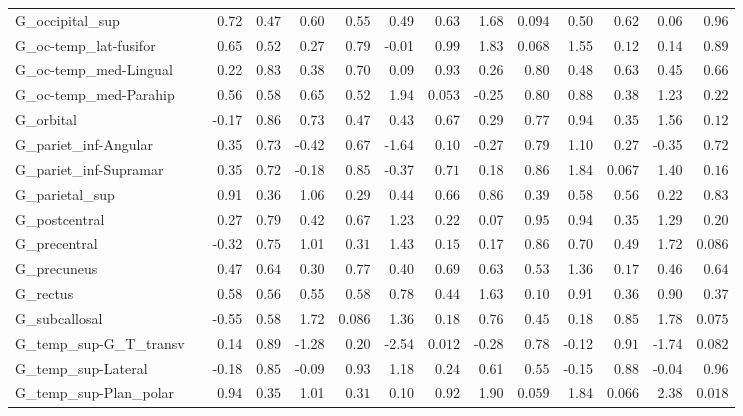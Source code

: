 {\begin{longtable}{llrrrrrrrrrrrr}
G\_occipital\_sup &  & 0.72 & $0.47$ & 0.60 & $0.55$ & 0.49 & $0.63$ & 1.68 & $0.094$ & 0.50 & $0.62$ & 0.06 & $0.96$ \\
G\_oc-temp\_lat-fusifor &  & 0.65 & $0.52$ & 0.27 & $0.79$ & -0.01 & $0.99$ & 1.83 & $0.068$ & 1.55 & $0.12$ & 0.14 & $0.89$ \\
G\_oc-temp\_med-Lingual &  & 0.22 & $0.83$ & 0.38 & $0.70$ & 0.09 & $0.93$ & 0.26 & $0.80$ & 0.48 & $0.63$ & 0.45 & $0.66$ \\
G\_oc-temp\_med-Parahip &  & 0.56 & $0.58$ & 0.65 & $0.52$ & 1.94 & $0.053$ & -0.25 & $0.80$ & 0.88 & $0.38$ & 1.23 & $0.22$ \\
G\_orbital &  & -0.17 & $0.86$ & 0.73 & $0.47$ & 0.43 & $0.67$ & 0.29 & $0.77$ & 0.94 & $0.35$ & 1.56 & $0.12$ \\
G\_pariet\_inf-Angular &  & 0.35 & $0.73$ & -0.42 & $0.67$ & -1.64 & $0.10$ & -0.27 & $0.79$ & 1.10 & $0.27$ & -0.35 & $0.72$ \\
G\_pariet\_inf-Supramar &  & 0.35 & $0.72$ & -0.18 & $0.85$ & -0.37 & $0.71$ & 0.18 & $0.86$ & 1.84 & $0.067$ & 1.40 & $0.16$ \\
G\_parietal\_sup &  & 0.91 & $0.36$ & 1.06 & $0.29$ & 0.44 & $0.66$ & 0.86 & $0.39$ & 0.58 & $0.56$ & 0.22 & $0.83$ \\
G\_postcentral &  & 0.27 & $0.79$ & 0.42 & $0.67$ & 1.23 & $0.22$ & 0.07 & $0.95$ & 0.94 & $0.35$ & 1.29 & $0.20$ \\
G\_precentral &  & -0.32 & $0.75$ & 1.01 & $0.31$ & 1.43 & $0.15$ & 0.17 & $0.86$ & 0.70 & $0.49$ & 1.72 & $0.086$ \\
G\_precuneus &  & 0.47 & $0.64$ & 0.30 & $0.77$ & 0.40 & $0.69$ & 0.63 & $0.53$ & 1.36 & $0.17$ & 0.46 & $0.64$ \\
G\_rectus &  & 0.58 & $0.56$ & 0.55 & $0.58$ & 0.78 & $0.44$ & 1.63 & $0.10$ & 0.91 & $0.36$ & 0.90 & $0.37$ \\
G\_subcallosal &  & -0.55 & $0.58$ & 1.72 & $0.086$ & 1.36 & $0.18$ & 0.76 & $0.45$ & 0.18 & $0.85$ & 1.78 & $0.075$ \\
G\_temp\_sup-G\_T\_transv &  & 0.14 & $0.89$ & -1.28 & $0.20$ & -2.54 & $0.012$ & -0.28 & $0.78$ & -0.12 & $0.91$ & -1.74 & $0.082$ \\
G\_temp\_sup-Lateral &  & -0.18 & $0.85$ & -0.09 & $0.93$ & 1.18 & $0.24$ & 0.61 & $0.55$ & -0.15 & $0.88$ & -0.04 & $0.96$ \\
G\_temp\_sup-Plan\_polar &  & 0.94 & $0.35$ & 1.01 & $0.31$ & 0.10 & $0.92$ & 1.90 & $0.059$ & 1.84 & $0.066$ & 2.38 & $0.018$ \\

\end{longtable}}
